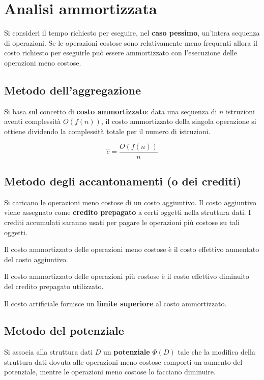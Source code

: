 \section{Analisi ammortizzata}

Si consideri il tempo richiesto per eseguire, nel \textbf{caso pessimo}, un'intera sequenza di operazioni. Se le operazioni costose sono relativamente meno frequenti allora il costo richiesto per eseguirle può essere ammortizzato con l'esecuzione delle operazioni meno costose.

\subsection{Metodo dell'aggregazione}

Si basa sul concetto di \textbf{costo ammortizzato}: data una sequenza di $n$ istruzioni aventi complessità $O(f(n))$, il costo ammortizzato della singola operazione si ottiene dividendo la complessità totale per il numero di istruzioni.

$$\hat{c}=\frac{O(f(n))}{n}$$

\subsection{Metodo degli accantonamenti (o dei crediti)}

Si caricano le operazioni meno costose di un costo aggiuntivo. Il costo aggiuntivo viene assegnato come \textbf{credito prepagato} a certi oggetti nella struttura dati. I crediti accumulati saranno usati per pagare le operazioni più costose su tali oggetti. 

Il costo ammortizzato delle operazioni meno costose è il costo effettivo aumentato del costo aggiuntivo. 

Il costo ammortizzato delle operazioni più costose è il costo effettivo diminuito del credito prepagato utilizzato.

Il costo artificiale fornisce un \textbf{limite superiore} al costo ammortizzato.

\subsection{Metodo del potenziale}

Si associa alla struttura dati $D$ un \textbf{potenziale} $\Phi(D)$ tale che la modifica della struttura dati dovuta alle operazioni meno costose comporti un aumento del potenziale, mentre le operazioni meno costose lo facciano diminuire.

